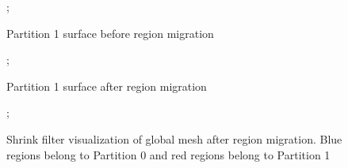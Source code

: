 \documentclass{article}
\begin{document}
\FloatBarrier
\begin{figure}
    ;
    \caption{Partition 1 surface before region migration}
\centering

\end{figure}
\begin{figure}
    ;
    \caption{Partition 1 surface after region migration}
\centering

\end{figure}
\begin{figure}
    ;
    \caption{Shrink filter visualization of global mesh after region migration. Blue regions belong to Partition 0 and red regions belong to Partition 1}
\centering

\end{figure}

\FloatBarrier

\lstset{linewidth = 16cm, xrightmargin = 0cm}
\lstlistoflistings

\end{document}
